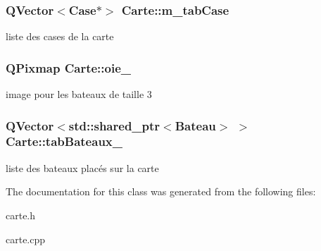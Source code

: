 \subsubsection[{\texorpdfstring{m\+\_\+tab\+Case}{m_tabCase}}]{\setlength{\rightskip}{0pt plus 5cm}Q\+Vector$<${\bf Case}$\ast$$>$ Carte\+::m\+\_\+tab\+Case\hspace{0.3cm}{\ttfamily [protected]}}\hypertarget{class_carte_adb0cda59419437b3c29b4b6e7abbbbf5}{}\label{class_carte_adb0cda59419437b3c29b4b6e7abbbbf5}
liste des cases de la carte 
\subsubsection[{\texorpdfstring{oie\+\_\+}{oie_}}]{\setlength{\rightskip}{0pt plus 5cm}Q\+Pixmap Carte\+::oie\+\_\+\hspace{0.3cm}{\ttfamily [protected]}}\hypertarget{class_carte_ac66303b2e5f99770c450993f45b9ebc2}{}\label{class_carte_ac66303b2e5f99770c450993f45b9ebc2}
image pour les bateaux de taille 3 
\subsubsection[{\texorpdfstring{tab\+Bateaux\+\_\+}{tabBateaux_}}]{\setlength{\rightskip}{0pt plus 5cm}Q\+Vector$<$std\+::shared\+\_\+ptr$<${\bf Bateau}$>$ $>$ Carte\+::tab\+Bateaux\+\_\+\hspace{0.3cm}{\ttfamily [protected]}}\hypertarget{class_carte_a5551a4561583b6536efe31b8de645f60}{}\label{class_carte_a5551a4561583b6536efe31b8de645f60}
liste des bateaux placés sur la carte 

The documentation for this class was generated from the following files\+:\begin{DoxyCompactItemize}
\item 
carte.\+h\item 
carte.\+cpp\end{DoxyCompactItemize}
